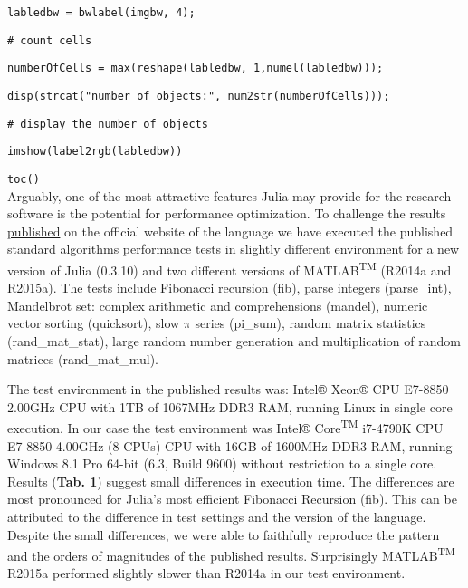 \verb|labledbw = bwlabel(imgbw, 4);|

\verb|# count cells|

\verb|numberOfCells = max(reshape(labledbw, 1,numel(labledbw)));|

\verb|disp(strcat("number of objects:", num2str(numberOfCells)));|

\verb|# display the number of objects|

\verb|imshow(label2rgb(labledbw))|

\verb|toc()|\\



Arguably, one of the most attractive features Julia may provide for the research software is the potential for performance optimization. To challenge the results \href{http://julialang.org/benchmarks/}{published} on the official website of the language we have executed the published standard algorithms performance tests in slightly different environment for a new version of Julia (0.3.10) and two different versions of MATLAB\textsuperscript{TM} (R2014a and R2015a). The tests include Fibonacci recursion (fib), parse integers (parse\_int), Mandelbrot set: complex arithmetic and comprehensions (mandel), numeric vector sorting (quicksort), slow $\pi$ series (pi\_sum), random matrix statistics (rand\_mat\_stat), large random number generation and multiplication of random matrices (rand\_mat\_mul).

The test environment in the published results was: Intel® Xeon® CPU E7-8850 2.00GHz CPU with 1TB of 1067MHz DDR3 RAM, running Linux in single core execution. In our case the test environment was Intel® Core\textsuperscript{TM} i7-4790K CPU E7-8850 4.00GHz (8 CPUs) CPU with 16GB of 1600MHz DDR3 RAM, running Windows 8.1 Pro 64-bit (6.3, Build 9600) without restriction to a single core. Results (\textbf{Tab. 1}) suggest small differences in execution time. The differences are most pronounced for Julia's most efficient Fibonacci Recursion (fib). This can be attributed to the difference in test settings and the version of the language. Despite the small differences, we were able to faithfully reproduce the pattern and the orders of magnitudes of the published results. Surprisingly MATLAB\textsuperscript{TM} R2015a performed slightly slower than R2014a in our test environment.

